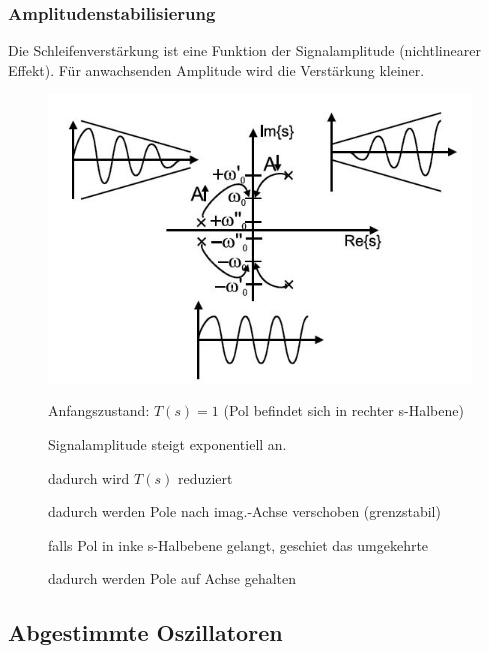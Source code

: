 \subsubsection{Amplitudenstabilisierung}
Die Schleifenverstärkung ist eine Funktion der Signalamplitude (nichtlinearer Effekt). Für anwachsenden Amplitude wird die Verstärkung kleiner. 
\begin{figure}[h!]
	\begin{minipage}{0.4\textwidth} 
	  \includegraphics[width=1\textwidth]{images/Pollage_Regelung}
	\end{minipage}
	\begin{minipage}{0.5\textwidth}
      \begin{compactenum}
        \item Anfangszustand: $T(s)=1$ (Pol befindet sich in rechter s-Halbene)
        \item Signalamplitude steigt exponentiell an.
        \item dadurch wird $T(s)$ reduziert
        \item dadurch werden Pole nach imag.-Achse verschoben (grenzstabil)
        \item falls Pol in inke s-Halbebene gelangt, geschiet das umgekehrte
        \item dadurch werden Pole auf Achse gehalten
      \end{compactenum}
	\end{minipage}
\end{figure}

\FloatBarrier
\subsection{Abgestimmte Oszillatoren }

